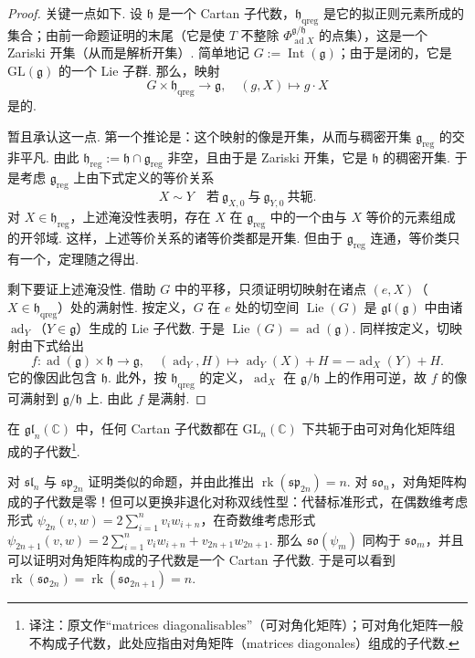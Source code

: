 \begin{proof}
关键一点如下. 设 $\mathfrak h$ 是一个 Cartan 子代数，$\mathfrak h_{\mathrm{qreg}}$ 是它的拟正则元素所成的集合；由前一命题证明的末尾（它是使 $T$ 不整除 $\Phi^{\mathfrak g/\mathfrak h}_{\operatorname{ad}X}$ 的点集），这是一个 Zariski 开集（从而是解析开集）. 简单地记 $G:=\operatorname{Int}(\mathfrak g)$；由于是闭的，它是 $\mathrm{GL}(\mathfrak g)$ 的一个 Lie 子群. 那么，映射
\[G\times\mathfrak h_{\mathrm{qreg}}\longrightarrow\mathfrak g,\quad (g,X)\mapsto g\cdot X\]
是的.

暂且承认这一点. 第一个推论是：这个映射的像是开集，从而与稠密开集 $\mathfrak g_{\mathrm{reg}}$ 的交非平凡. 由此 $\mathfrak h_{\mathrm{reg}}:=\mathfrak h\cap\mathfrak g_{\mathrm{reg}}$ 非空，且由于是 Zariski 开集，它是 $\mathfrak h$ 的稠密开集. 于是考虑 $\mathfrak g_{\mathrm{reg}}$ 上由下式定义的等价关系
\[X\sim Y\quad\text{若}\ \mathfrak g_{X,0}\ \text{与}\ \mathfrak g_{Y,0}\ \text{共轭}.\]
对 $X\in\mathfrak h_{\mathrm{reg}}$，上述淹没性表明，存在 $X$ 在 $\mathfrak g_{\mathrm{reg}}$ 中的一个由与 $X$ 等价的元素组成的开邻域. 这样，上述等价关系的诸等价类都是开集. 但由于 $\mathfrak g_{\mathrm{reg}}$ 连通，等价类只有一个，定理随之得出.

剩下要证上述淹没性. 借助 $G$ 中的平移，只须证明切映射在诸点 $(e,X)$（$X\in\mathfrak h_{\mathrm{qreg}}$）处的满射性. 按定义，$G$ 在 $e$ 处的切空间 $\operatorname{Lie}(G)$ 是 $\mathfrak{gl}(\mathfrak g)$ 中由诸 $\operatorname{ad}_Y$（$Y\in\mathfrak g$）生成的 Lie 子代数. 于是 $\operatorname{Lie}(G)=\operatorname{ad}(\mathfrak g)$. 同样按定义，切映射由下式给出
\[f\colon \operatorname{ad}(\mathfrak g)\times\mathfrak h\longrightarrow\mathfrak g,\quad (\operatorname{ad}_Y,H)\mapsto\operatorname{ad}_Y(X)+H=-\operatorname{ad}_X(Y)+H.\]
它的像因此包含 $\mathfrak h$. 此外，按 $\mathfrak h_{\mathrm{qreg}}$ 的定义，$\operatorname{ad}_X$ 在 $\mathfrak g/\mathfrak h$ 上的作用可逆，故 $f$ 的像可满射到 $\mathfrak g/\mathfrak h$ 上. 由此 $f$ 是满射.
\end{proof}
\begin{example*}
在 $\mathfrak{gl}_n(\mathbb C)$ 中，任何 Cartan 子代数都在 $\mathrm{GL}_n(\mathbb C)$ 下共轭于由可对角化矩阵组成的子代数\footnote{译注：原文作``matrices diagonalisables''（可对角化矩阵）；可对角化矩阵一般不构成子代数，此处应指由对角矩阵（matrices diagonales）组成的子代数.}.
\end{example*}
\begin{exercise*}
对 $\mathfrak{sl}_n$ 与 $\mathfrak{sp}_{2n}$ 证明类似的命题，并由此推出 $\operatorname{rk}(\mathfrak{sp}_{2n})=n$. 对 $\mathfrak{so}_n$，对角矩阵构成的子代数是零！但可以更换非退化对称双线性型：代替标准形式，在偶数维考虑形式 $\psi_{2n}(v,w)=2\sum_{i=1}^n v_iw_{i+n}$，在奇数维考虑形式 $\psi_{2n+1}(v,w)=2\sum_{i=1}^n v_iw_{i+n}+v_{2n+1}w_{2n+1}$. 那么 $\mathfrak{so}(\psi_m)$ 同构于 $\mathfrak{so}_m$，并且可以证明对角矩阵构成的子代数是一个 Cartan 子代数. 于是可以看到 $\operatorname{rk}(\mathfrak{so}_{2n})=\operatorname{rk}(\mathfrak{so}_{2n+1})=n$.
\end{exercise*}

